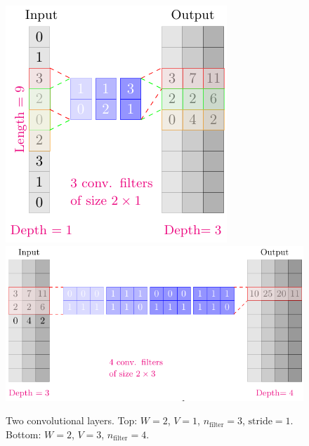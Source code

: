 \begin{figure}
\includegraphics[scale=1, center]{../tikz_per_manuscritto/conv_filter_2_1.pdf} \\
\includegraphics[scale=1, center]{../tikz_per_manuscritto/conv_filter_2_3.pdf} 

\caption[Convolutional layer.]{Two convolutional layers. Top: $W=2$, $V=1$, $n_{\text{filter}}=3$, $\mathrm{stride}=1$. Bottom: $W=2$, $V=3$, $n_{\text{filter}}=4$. }\label{fig:conv_layer}
\end{figure}


